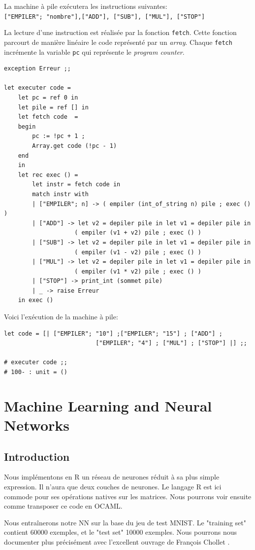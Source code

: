 \documentclass[11pt]{book}
\begin{document}
La machine à pile exécutera les instructions suivantes:\\
\verb+["EMPILER"; "nombre"],["ADD"], ["SUB"], ["MUL"], ["STOP"]+

La lecture d'une instruction est réalisée par la fonction \texttt{fetch}. Cette
fonction parcourt de manière linéaire le code représenté par un \textit{array}.
Chaque \texttt{fetch} incrémente la variable \verb+pc+ qui représente le
\textit{program counter}.

\begin{Verbatim}
exception Erreur ;;
	
let executer code =
	let pc = ref 0 in
	let pile = ref [] in
	let fetch code  =
	begin
		pc := !pc + 1 ; 
		Array.get code (!pc - 1) 
	end 
	in
	let rec exec () =
		let instr = fetch code in
		match instr with
		| ["EMPILER"; n] -> ( empiler (int_of_string n) pile ; exec () )
		| ["ADD"] -> let v2 = depiler pile in let v1 = depiler pile in 
		            ( empiler (v1 + v2) pile ; exec () )
		| ["SUB"] -> let v2 = depiler pile in let v1 = depiler pile in
		            ( empiler (v1 - v2) pile ; exec () )
		| ["MUL"] -> let v2 = depiler pile in let v1 = depiler pile in
		            ( empiler (v1 * v2) pile ; exec () )
		| ["STOP"] -> print_int (sommet pile)
		| _ -> raise Erreur
	in exec ()
\end{Verbatim}

Voici l'exécution de la machine à pile:
\begin{Verbatim}
let code = [| ["EMPILER"; "10"] ;["EMPILER"; "15"] ; ["ADD"] ;
						  ["EMPILER"; "4"] ; ["MUL"] ; ["STOP"] |] ;;
						  
# executer code ;;
# 100- : unit = ()
\end{Verbatim}

\section{Machine Learning and Neural Networks}

\subsection{Introduction}

Nous implémentons en R un réseau de neurones réduit à sa plus simple expression.
Il n'aura que deux couches de neurones.
Le langage R est ici commode pour ses opérations natives sur les matrices.
Nous pourrons voir ensuite comme transposer ce code en OCAML.

Nous entraînerons notre NN sur la base du jeu de test MNIST.
Le  "training set" contient 60000 exemples, et le "test set" 10000 exemples.
Nous pourrons nous documenter plus précisément avec l'excellent ouvrage de François Chollet \cite{deepR}.
\end{document}
